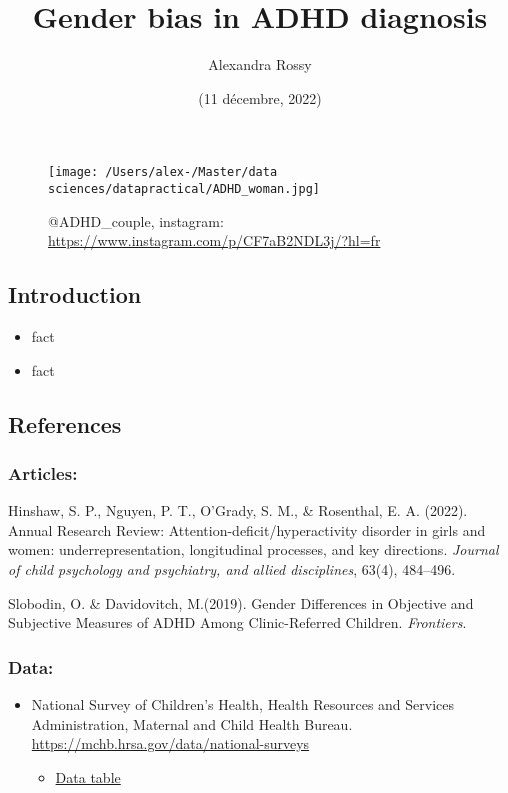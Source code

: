\documentclass[
]{article}
\title{Gender bias in ADHD diagnosis}
\author{Alexandra Rossy}
\date{(11 décembre, 2022)}
\providecommand{\tightlist}{%
  \setlength{\itemsep}{0pt}\setlength{\parskip}{0pt}}
\begin{document}
\maketitle

\begin{figure}
\centering
\texttt{[image: /Users/alex-/Master/data sciences/datapractical/ADHD\_woman.jpg]}
\caption{@ADHD\_couple, instagram:
\url{https://www.instagram.com/p/CF7aB2NDL3j/?hl=fr}}
\end{figure}

\hypertarget{introduction}{%
\subsection{Introduction}\label{introduction}}

\begin{itemize}
\tightlist
\item
  fact
\item
  fact
\end{itemize}

\hypertarget{references}{%
\subsection{References}\label{references}}

\hypertarget{articles}{%
\subsubsection{Articles:}\label{articles}}

Hinshaw, S. P., Nguyen, P. T., O'Grady, S. M., \& Rosenthal, E. A.
(2022). Annual Research Review: Attention-deficit/hyperactivity disorder
in girls and women: underrepresentation, longitudinal processes, and key
directions. \emph{Journal of child psychology and psychiatry, and allied
disciplines}, 63(4), 484--496.

Slobodin, O. \& Davidovitch, M.(2019). Gender Differences in Objective
and Subjective Measures of ADHD Among Clinic-Referred Children.
\emph{Frontiers}.

\hypertarget{data}{%
\subsubsection{Data:}\label{data}}

\begin{itemize}
\tightlist
\item
  National Survey of Children's Health, Health Resources and Services
  Administration, Maternal and Child Health Bureau.
  \url{https://mchb.hrsa.gov/data/national-surveys}

  \begin{itemize}
  \tightlist
  \item
    \href{https://www.childhealthdata.org/browse/survey/allstates?q=9343\&g=1008\&a=18062\#}{Data
    table}
  \end{itemize}
\end{itemize}
\end{document}
